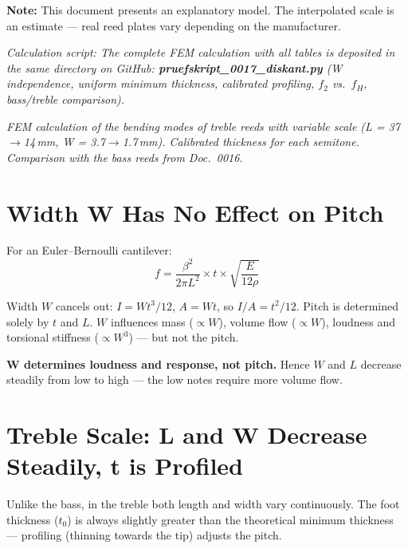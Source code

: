 \documentclass[11pt,a4paper]{article}
\begin{document}
\hbmaketitle
\begin{tcolorbox}[colframe=red!60!black, colback=red!5!white]
\textbf{Note:} This document presents an explanatory model.
The interpolated scale is an estimate --- real reed plates
vary depending on the manufacturer.
\end{tcolorbox}

\noindent\textit{\small Calculation script: The complete FEM calculation with all tables
is deposited in the same directory on GitHub:
\textbf{pruefskript\_0017\_diskant.py} (W independence, uniform minimum thickness,
calibrated profiling, $f_2$ vs.\ $f_H$, bass/treble comparison).}

\noindent\textit{FEM calculation of the bending modes of treble reeds with variable
scale (L = 37$\to$14\,mm, W = 3.7$\to$1.7\,mm). Calibrated thickness for each
semitone. Comparison with the bass reeds from Doc.~0016.}

\section{Width W Has No Effect on Pitch}

For an Euler--Bernoulli cantilever:
\begin{equation}
f = \frac{\beta^2}{2\pi L^2} \times t \times \sqrt{\frac{E}{12\rho}}
\end{equation}

Width $W$ cancels out: $I = Wt^3/12$, $A = Wt$, so $I/A = t^2/12$.
Pitch is determined solely by $t$ and $L$.
$W$ influences mass ($\propto W$), volume flow ($\propto W$),
loudness and torsional stiffness ($\propto W^3$) --- but not the pitch.

\begin{tcolorbox}[colframe=keygreen, colback=green!5!white]
\textbf{W determines loudness and response, not pitch.}
Hence $W$ and $L$ decrease steadily from low to high ---
the low notes require more volume flow.
\end{tcolorbox}

\section{Treble Scale: L and W Decrease Steadily, t is Profiled}

Unlike the bass, in the treble both length and width vary continuously.
The foot thickness ($t_0$) is always slightly greater than the theoretical
minimum thickness --- profiling (thinning towards the tip) adjusts the pitch.
\end{document}

